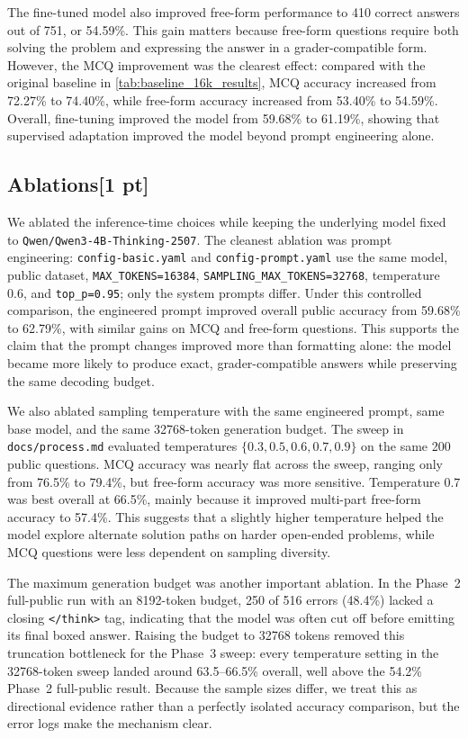 \documentclass{article}
\begin{document}
The fine-tuned model also improved free-form performance to 410 correct answers out of 751, or 54.59\%.  This gain matters because free-form questions require both solving the problem and expressing the answer in a grader-compatible form.  However, the MCQ improvement was the clearest effect: compared with the original baseline in \cref{tab:baseline_16k_results}, MCQ accuracy increased from 72.27\% to 74.40\%, while free-form accuracy increased from 53.40\% to 54.59\%.  Overall, fine-tuning improved the model from 59.68\% to 61.19\%, showing that supervised adaptation improved the model beyond prompt engineering alone.



\subsection{Ablations[1 pt]}
\label{sec:ablations}
We ablated the inference-time choices while keeping the underlying model fixed to
\texttt{Qwen/Qwen3-4B-Thinking-2507}.  The cleanest ablation was prompt engineering:
\texttt{config-basic.yaml} and \texttt{config-prompt.yaml} use the same model, public
dataset, \texttt{MAX\_TOKENS=16384}, \texttt{SAMPLING\_MAX\_TOKENS=32768},
temperature 0.6, and \texttt{top\_p=0.95}; only the system prompts differ.  Under this
controlled comparison, the engineered prompt improved overall public accuracy from
59.68\% to 62.79\%, with similar gains on MCQ and free-form questions.  This supports the
claim that the prompt changes improved more than formatting alone: the model became more
likely to produce exact, grader-compatible answers while preserving the same decoding
budget.

We also ablated sampling temperature with the same engineered prompt, same base model, and
the same 32768-token generation budget.  The sweep in \texttt{docs/process.md} evaluated
temperatures $\{0.3,0.5,0.6,0.7,0.9\}$ on the same 200 public questions.  MCQ accuracy was
nearly flat across the sweep, ranging only from 76.5\% to 79.4\%, but free-form accuracy
was more sensitive.  Temperature 0.7 was best overall at 66.5\%, mainly because it improved
multi-part free-form accuracy to 57.4\%.  This suggests that a slightly higher temperature
helped the model explore alternate solution paths on harder open-ended problems, while MCQ
questions were less dependent on sampling diversity.

The maximum generation budget was another important ablation.  In the Phase~2
full-public run with an 8192-token budget, 250 of 516 errors (48.4\%) lacked a closing
\texttt{</think>} tag, indicating that the model was often cut off before emitting its
final boxed answer.  Raising the budget to 32768 tokens removed this truncation bottleneck
for the Phase~3 sweep: every temperature setting in the 32768-token sweep landed around
63.5--66.5\% overall, well above the 54.2\% Phase~2 full-public result.  Because the sample
sizes differ, we treat this as directional evidence rather than a perfectly isolated
accuracy comparison, but the error logs make the mechanism clear.
\end{document}
